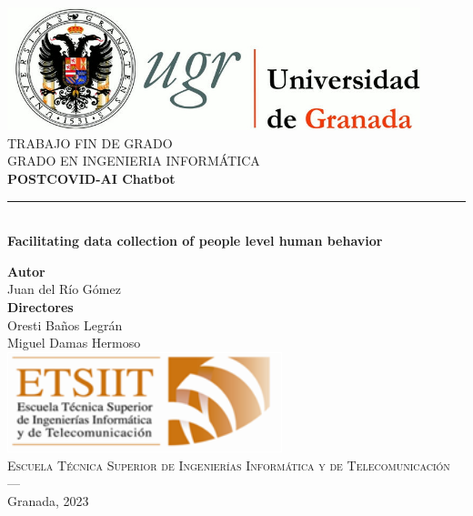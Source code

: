\begin{titlepage}
 
 
\newlength{\centeroffset}
\setlength{\centeroffset}{-0.5\oddsidemargin}
\addtolength{\centeroffset}{0.5\evensidemargin}
\thispagestyle{empty}

\noindent\hspace*{\centeroffset}\begin{minipage}{\textwidth}

\centering
\includegraphics[width=0.9\textwidth]{imagenes/logo_ugr.jpg}\\[1.4cm]

\textsc{ \Large TRABAJO FIN DE GRADO\\[0.2cm]}
\textsc{ GRADO EN INGENIERIA INFORMÁTICA }\\[1cm]
% 
{\Huge\bfseries POSTCOVID-AI Chatbot\\
}
\noindent\rule[-1ex]{\textwidth}{3pt}\\[3.5ex]
{\large\bfseries Facilitating data collection of people level human behavior\\
}
\end{minipage}

\vspace{1cm}
\noindent\hspace*{\centeroffset}\begin{minipage}{\textwidth}
\centering

\textbf{Autor}\\ {Juan del Río Gómez}\\[2.5ex]
\textbf{Directores}\\
{Oresti Baños Legrán \\
Miguel Damas Hermoso}\\[1.5cm]
\includegraphics[width=0.6\textwidth]{imagenes/etsiit_logo.png}\\[0.1cm]
\textsc{Escuela Técnica Superior de Ingenierías Informática y de Telecomunicación}\\
\textsc{---}\\
Granada, 2023
\end{minipage}
\end{titlepage}


